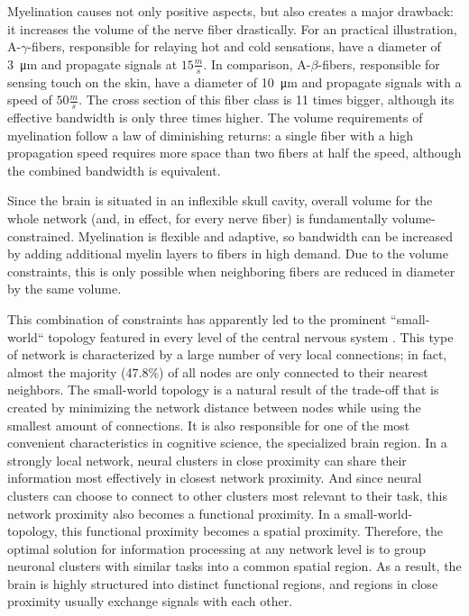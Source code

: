 Myelination causes not only positive aspects, but also creates a major drawback: it increases the volume of the nerve fiber drastically.
For an practical illustration, A-$\gamma$-fibers, responsible for relaying hot and cold sensations, have a diameter of \SI{3}{\um} and propagate signals at $15\frac{m}{s}$.
In comparison, A-$\beta$-fibers, responsible for sensing touch on the skin, have a diameter of \SI{10}{\um} and propagate signals with a speed of $50\frac{m}{s}$.
The cross section of this fiber class is 11 times bigger, although its effective bandwidth is only three times higher.
The volume requirements of myelination follow a law of diminishing returns: a single fiber with a high propagation speed requires more space than two fibers at half the speed, although the combined bandwidth is equivalent.

Since the brain is situated in an inflexible skull cavity, overall volume for the whole network (and, in effect, for every nerve fiber) is fundamentally volume-constrained.
Myelination is flexible and adaptive, so bandwidth can be increased by adding additional myelin layers to fibers in high demand.
Due to the volume constraints, this is only possible when neighboring fibers are reduced in diameter by the same volume.

This combination of constraints has apparently led to the prominent ``small-world`` topology featured in every level of the central nervous system \cite{1.1.smallWorld}.
This type of network is characterized by a large number of very local connections; in fact, almost the majority (47.8\%) of all nodes are only connected to their nearest neighbors.
The small-world topology is a natural result of the trade-off that is created by minimizing the network distance between nodes while using the smallest amount of connections.
It is also responsible for one of the most convenient characteristics in cognitive science, the specialized brain region.
In a strongly local network, neural clusters in close proximity can share their information most effectively in closest network proximity.
And since neural clusters can choose to connect to other clusters most relevant to their task, this network proximity also becomes a functional proximity.
In a small-world-topology, this functional proximity becomes a spatial proximity.
Therefore, the optimal solution for information processing at any network level is to group neuronal clusters with similar tasks into a common spatial region.
As a result, the brain is highly structured into distinct functional regions, and regions in close proximity usually exchange signals with each other.

